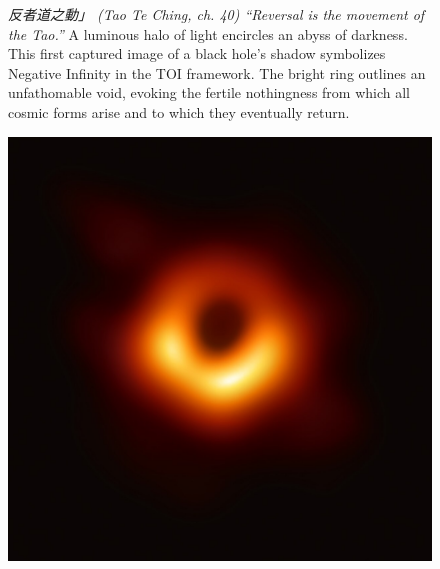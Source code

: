 \documentclass[11pt]{article}
\begin{document}
\begin{figure}[ht]
    \centering
\begin{minipage}[c]{0.55\textwidth}
        \small
        \textit{反者道之動」 (Tao Te Ching, ch. 40) “Reversal is the movement of the Tao.”}
        A luminous halo of light encircles an abyss of darkness. This first captured image of a black hole's shadow symbolizes Negative Infinity in the TOI framework. The bright ring outlines an unfathomable void, evoking the fertile nothingness from which all cosmic forms arise and to which they eventually return.
    \end{minipage}    
    \hfill
    \begin{minipage}[c]{0.35\textwidth}
        \includegraphics[width=\linewidth]{assets/Black_hole_-_Messier_87_crop_max_res.jpg} 
    \end{minipage}
\end{figure}

\newpage
\end{document}
